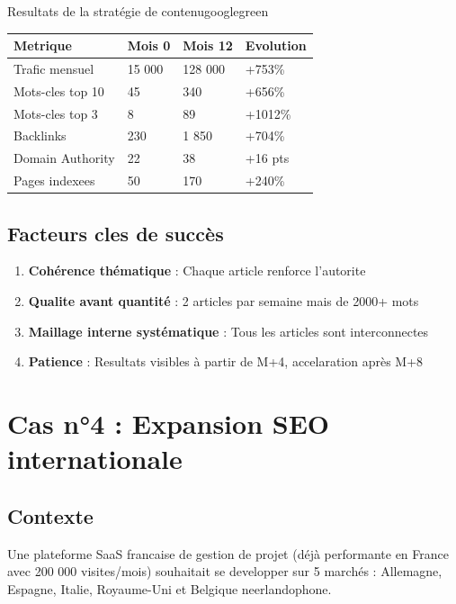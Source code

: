 \begin{mybox}{Resultats de la stratégie de contenu}{googlegreen}
\begin{tabular}{llll}
    \toprule
    \textbf{Metrique} & \textbf{Mois 0} & \textbf{Mois 12} & \textbf{Evolution} \\
    \midrule
    Trafic mensuel     & 15 000          & 128 000          & +753\% \\
    Mots-cles top 10   & 45              & 340              & +656\% \\
    Mots-cles top 3    & 8               & 89               & +1012\% \\
    Backlinks          & 230             & 1 850            & +704\% \\
    Domain Authority   & 22              & 38               & +16 pts \\
    Pages indexees     & 50              & 170              & +240\% \\
    \bottomrule
\end{tabular}
\end{mybox}

\subsection{Facteurs cles de succès}
\begin{enumerate}
    \item \textbf{Cohérence thématique} : Chaque article renforce l'autorite
    \item \textbf{Qualite avant quantité} : 2 articles par semaine mais de 2000+ mots
    \item \textbf{Maillage interne systématique} : Tous les articles sont interconnectes
    \item \textbf{Patience} : Resultats visibles à partir de M+4, accelaration après M+8
\end{enumerate}

\section{Cas n°4 : Expansion SEO internationale}

\subsection{Contexte}
Une plateforme SaaS francaise de gestion de projet (déjà performante en France avec 200 000 visites/mois) souhaitait se developper sur 5 marchés : Allemagne, Espagne, Italie, Royaume-Uni et Belgique neerlandophone.


